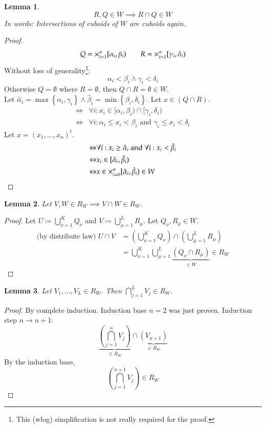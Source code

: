 \documentclass{article}
\newtheorem{lemma}{Lemma}  \numberwithin{lemma}{section}
\newcommand{\set}[1]{\left\{#1\right\}}
\begin{document}
\begin{lemma}
  \label{l:two}
  \[ R, Q \in W \implies R \cap Q \in W \]
  In words: Intersections of cuboids of $W$ are cuboids again.
\end{lemma}
\begin{proof}
  \[ Q = {\huge\times}_{i=1}^n [\alpha_i, \beta_i) \qquad R = {\huge\times}_{i=1}^n [\gamma_i, \delta_i) \]
  Without loss of generality\footnote{This (wlog) simplification is not really required for the proof.}:
  \[ \alpha_i < \beta_i \land \gamma_i < \delta_i \]
  Otherwise $Q = \emptyset$ where $R = \emptyset$, then $Q \cap R = \emptyset \in W$. \\
  Let $\hat \alpha_i = \max\set{\alpha_i, \gamma_i} \land \hat \beta_i = \min\set{\beta_i, \delta_i}$.
  Let $x \in (Q \cap R)$.
  \begin{align*}
    \Leftrightarrow & \forall i: x_i \in [\alpha_i, \beta_i) \cap [\gamma_i, \delta_i) \\
    \Leftrightarrow & \forall i: \alpha_i \leq x_i < \beta_i \text{ and } \gamma_i \leq x_i < \delta_i
  \end{align*}
  Let $x = (x_1, \ldots, x_n)^t$.
  \begin{align*}
    \Leftrightarrow & \forall i: x_i \geq \hat \alpha_i \text{ and } \forall i: x_i < \hat \beta_i \\
    \Leftrightarrow & x_i \in [\hat\alpha_i, \hat\beta_i) \\
    \Leftrightarrow & x \in \huge\times_{i=0}^n [\hat\alpha_i, \hat\beta_i) \in W
  \end{align*}
\end{proof}

\begin{lemma}
  \label{l:three}
  Let $V, W \in R_W \implies V \cap W \in R_{W}$.
\end{lemma}
\begin{proof}
  Let $U \coloneqq \bigcup_{\nu=1}^K Q_\nu$ and $V \coloneqq \bigcup_{\mu=1}^L R_\mu$.
  Let $Q_{\nu}, R_{\mu} \in W$.
  \begin{align*}
    \text{(by distribute law) } U \cap V
      &= \left(\bigcup_{\nu=1}^K Q_\nu\right) \cap \left(\bigcup_{\mu=1}^L R_\mu\right) \\
      &= \bigcup_{\nu=1}^K \bigcup_{\mu=1}^L \underbrace{\left(Q_\nu \cap R_\mu\right)}_{\in W} \in R_{W}
  \end{align*}
\end{proof}

\begin{lemma}
  \label{l:four}
  Let $V_1, \ldots, V_L \in R_{W}$. Then $\bigcap_{j=1}^L V_j \in R_{W}$.
\end{lemma}
\begin{proof}
  By complete induction. Induction base $n=2$ was just proven.
  Induction step $n \to n + 1$:
  \[
     \underbrace{\left(\bigcap_{j=1}^n V_j\right)}_{\in R_W}
     \cap
     \underbrace{\left(V_{n+1}\right)}_{\in R_W}
  \]
  By the induction base,
  \[ {\left(\bigcap_{j=1}^{n+1} V_j\right)} {\in R_W} \]
\end{proof}
\end{document}
